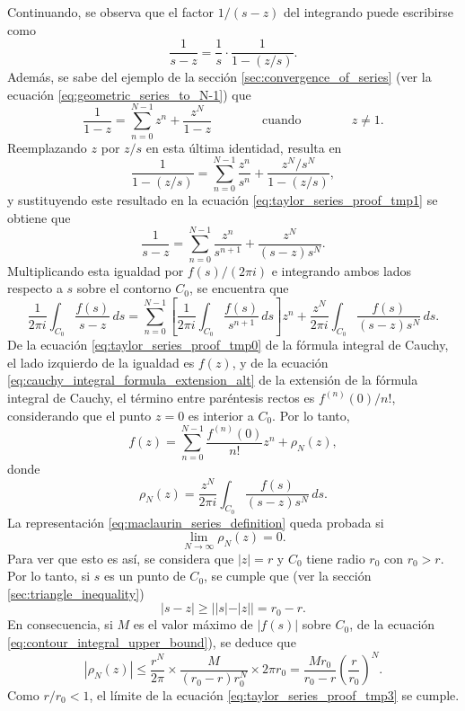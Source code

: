 \documentclass[a4paper]{report}
\begin{document}
Continuando, se observa que el factor \(1/(s-z)\) del integrando puede escribirse como 
\begin{equation}\label{eq:taylor_series_proof_tmp1}
 \frac{1}{s-z}=\frac{1}{s}\cdot\frac{1}{1-(z/s)}. 
\end{equation}
Además, se sabe del ejemplo de la sección \ref{sec:convergence_of_series} (ver la ecuación \ref{eq:geometric_series_to_N-1}) que 
\[
 \frac{1}{1-z}=\sum_{n=0}^{N-1}z^n+\frac{z^N}{1-z}
 \qquad\qquad\textrm{cuando}\qquad\qquad
 z\neq 1. 
\]
Reemplazando \(z\) por \(z/s\) en esta última identidad, resulta en
\[
 \frac{1}{1-(z/s)}=\sum_{n=0}^{N-1}\frac{z^n}{s^n}+\frac{z^N/s^N}{1-(z/s)},
\]
y sustituyendo este resultado en la ecuación \ref{eq:taylor_series_proof_tmp1} se obtiene que 
\begin{equation}\label{eq:taylor_series_proof_tmp2}
 \frac{1}{s-z}=\sum_{n=0}^{N-1}\frac{z^n}{s^{n+1}}+\frac{z^N}{(s-z)s^N}. 
\end{equation}
Multiplicando esta igualdad por \(f(s)/(2\pi i)\) e integrando ambos lados respecto a \(s\) sobre el contorno \(C_0\), se encuentra que 
\[
 \frac{1}{2\pi i}\int_{C_0}\frac{f(s)}{s-z}\,ds=\sum_{n=0}^{N-1}\left[\frac{1}{2\pi i}\int_{C_0}\frac{f(s)}{s^{n+1}}\,ds\right]z^n+\frac{z^N}{2\pi i}\int_{C_0}\frac{f(s)}{(s-z)s^N}\,ds.
\]
De la ecuación \ref{eq:taylor_series_proof_tmp0} de la fórmula integral de Cauchy, el lado izquierdo de la igualdad es \(f(z)\), y de la ecuación \ref{eq:cauchy_integral_formula_extension_alt} de la extensión de la fórmula integral de Cauchy, el término entre paréntesis rectos es \(f^{(n)}(0)/n!\), considerando que el punto \(z=0\) es interior a \(C_0\). Por lo tanto,
\[
 f(z)=\sum_{n=0}^{N-1}\frac{f^{(n)}(0)}{n!}z^n+\rho_N(z),
\]
donde
\[
 \rho_N(z)=\frac{z^N}{2\pi i}\int_{C_0}\frac{f(s)}{(s-z)s^N}\,ds.
\]
La representación \ref{eq:maclaurin_series_definition} queda probada si
\begin{equation}\label{eq:taylor_series_proof_tmp3}
 \lim_{N\to\infty}\rho_N(z)=0. 
\end{equation}
Para ver que esto es así, se considera que \(|z|=r\) y \(C_0\) tiene radio \(r_0\) con \(r_0>r\). Por lo tanto, si \(s\) es un punto de \(C_0\), se cumple que (ver la sección \ref{sec:triangle_inequality})
\[
 |s-z|\geq||s|-|z||=r_0-r.
\]
En consecuencia, si \(M\) es el valor máximo de \(|f(s)|\) sobre \(C_0\), de la ecuación \ref{eq:contour_integral_upper_bound}), se deduce que
\[
 |\rho_N(z)|\leq\frac{r^N}{2\pi}\times\frac{M}{(r_0-r)r_0^N}\times2\pi r_0=\frac{Mr_0}{r_0-r}\left(\frac{r}{r_0}\right)^N.
\]
Como \(r/r_0<1\), el límite de la ecuación \ref{eq:taylor_series_proof_tmp3} se cumple.
\end{document}
